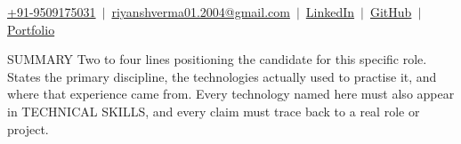 \documentclass{resume} %
\begin{document}


\vspace{-22pt}

\begin{center}
    {\normalsize
    \href{tel:+919509175031}{+91-9509175031}
    \,${\vert}$\,
    \href{mailto:riyanshverma01.2004@gmail.com}{riyanshverma01.2004@gmail.com}
    \,${\vert}$\,
    \href{https://www.linkedin.com/in/riyansh-verma}{LinkedIn}
    \,${\vert}$\,
    \href{https://github.com/Riyanshverma}{GitHub}
    \,${\vert}$\,
    \href{https://riyansh-portfolio-five.vercel.app/}{Portfolio}
    }
    \\[2pt]
\end{center}

\vspace{-2pt}


\begin{rSection}{SUMMARY}
Two to four lines positioning the candidate for this specific role. States the
primary discipline, the technologies actually used to practise it, and where
that experience came from. Every technology named here must also appear in
TECHNICAL SKILLS, and every claim must trace back to a real role or project.

\end{rSection}

\vspace{-2pt}

\end{document}
